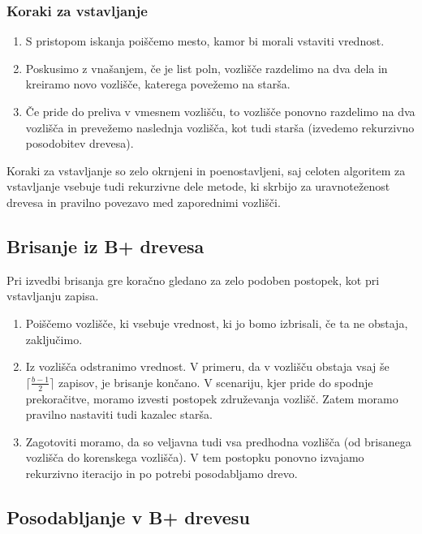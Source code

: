 \documentclass[a4paper,12pt,openright]{book}
\begin{document}
        \subsubsection{Koraki za vstavljanje}
        
        \begin{enumerate}
            \item S pristopom iskanja poiščemo mesto, kamor bi morali vstaviti vrednost.
            \item Poskusimo z vnašanjem, če je list poln, vozlišče razdelimo na dva dela in kreiramo novo vozlišče, katerega povežemo na starša.
            \item Če pride do preliva v vmesnem vozlišču, to vozlišče ponovno razdelimo na dva vozlišča in prevežemo naslednja vozlišča, kot tudi starša (izvedemo rekurzivno posodobitev drevesa).
        \end{enumerate}

        \noindent
        Koraki za vstavljanje so zelo okrnjeni in poenostavljeni, saj celoten algoritem za vstavljanje vsebuje tudi rekurzivne dele metode, ki skrbijo za uravnoteženost drevesa in pravilno povezavo med zaporednimi vozlišči.

        \subsection{Brisanje iz B+ drevesa}

        Pri izvedbi brisanja gre koračno gledano za zelo podoben postopek, kot pri vstavljanju zapisa.

        \begin{enumerate}
            \item Poiščemo vozlišče, ki vsebuje vrednost, ki jo bomo izbrisali, če ta ne obstaja, zaključimo.
            \item Iz vozlišča odstranimo vrednost. V primeru, da v vozlišču obstaja vsaj še $\lceil \frac{b - 1}{2}\rceil$ zapisov, je brisanje končano. V scenariju, kjer pride do spodnje prekoračitve, moramo izvesti postopek združevanja vozlišč. Zatem moramo pravilno nastaviti tudi kazalec starša.
            \item Zagotoviti moramo, da so veljavna tudi vsa predhodna vozlišča (od brisanega vozlišča do korenskega vozlišča). V tem postopku ponovno izvajamo rekurzivno iteracijo in po potrebi posodabljamo drevo.
        \end{enumerate}

        \subsection{Posodabljanje v B+ drevesu}
\end{document}
